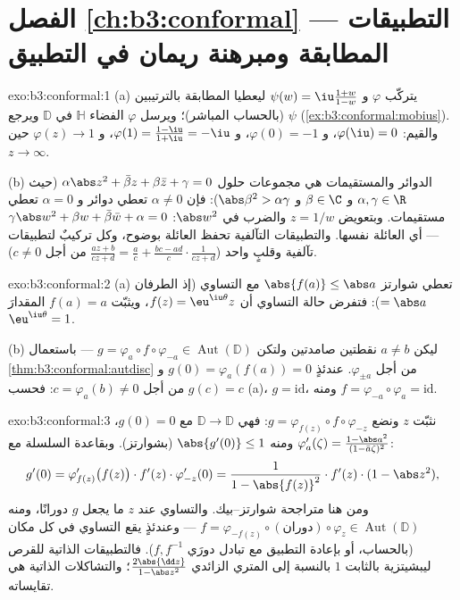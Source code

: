 \section*{الفصل \ref{ch:b3:conformal} --- التطبيقات المطابقة
ومبرهنة ريمان في التطبيق}

\begin{solution}{exo:b3:conformal:1}
(a) يتركّب $\varphi$ و $\psi(w) = \iu\frac{1+w}{1-w}$ ليعطيا المطابقة بالترتيبين (بالحساب
المباشر)؛ ويرسل $\varphi$ الفضاء $\mathbb H$ في $\mathbb D$
ويرجع $\psi$ (\cref{ex:b3:conformal:mobius}). والقيم: $\varphi(\iu) = 0$، و $\varphi(0) = -1$، و $\varphi(1) = \frac{1 - \iu}{1 + \iu} =
-\iu$،
و $\varphi(z) \to 1$ حين $z \to \infty$.

(b) الدوائر والمستقيمات هي مجموعات حلول
$\alpha\abs z^2 + \bar\beta z + \beta\bar z + \gamma = 0$
(حيث $\alpha, \gamma \in \R$ و $\beta \in \C$ و $\abs\beta^2 >
\alpha\gamma$): فإن $\alpha \neq 0$
تعطي دوائر و $\alpha = 0$ تعطي مستقيمات. وبتعويض $z = 1/w$
والضرب في $\abs w^2$: $\gamma\abs w^2 + \beta w + \bar\beta\bar w + \alpha = 0$ --- أي العائلة نفسها. والتطبيقات
التآلفية تحفظ العائلة بوضوح، وكل  تركيبٌ لتطبيقات
تآلفية وقلبٍ واحد ($\frac{az+b}{cz+d} = \frac ac + \frac{bc -
ad}{c}\cdot\frac1{cz + d}$ من أجل $c \neq 0$).
\end{solution}

\begin{solution}{exo:b3:conformal:2}
(a) تعطي شوارتز $\abs{f(a)} \leq \abs a$ مع التساوي (إذ الطرفان $= \abs a$):
فتفرض حالة التساوي أن $f(z) =
\eu^{\iu\theta}z$، ويثبّت $f(a) = a$ المقدارَ $\eu^{\iu\theta} = 1$.

(b) ليكن $a \neq b$ نقطتين صامدتين ولتكن $g =
\varphi_a\circ f\circ\varphi_{-a} \in
\operatorname{Aut}(\mathbb D)$ --- باستعمال
\cref{thm:b3:conformal:autdisc} من أجل $\varphi_{\pm a}$. عندئذٍ $g(0) = \varphi_a(f(a)) = 0$ و $g(c) = c$ من أجل
$c =
\varphi_a(b) \neq 0$: فحسب (a)، $g = \mathrm{id}$، ومنه $f =
\varphi_{-a}\circ\varphi_a = \mathrm{id}$.
\end{solution}

\begin{solution}{exo:b3:conformal:3}
نثبّت $z$ ونضع $g = \varphi_{f(z)}\circ f\circ\varphi_{-z}$: فهي  $\mathbb D \to \mathbb D$ مع $g(0) = 0$،
ومنه $\abs{g'(0)} \leq 1$ (بشوارتز). وبقاعدة السلسلة مع $\varphi_a'(\zeta) = \frac{1 - \abs a^2}{(1 - \bar
a\zeta)^2}$:
\[
g'(0) = \varphi_{f(z)}'\bigl(f(z)\bigr)\cdot f'(z)\cdot
\varphi_{-z}'(0)
= \frac{1}{1 - \abs{f(z)}^2}\cdot f'(z)\cdot(1 - \abs z^2),
\]
ومن هنا متراجحة شوارتز--بيك. والتساوي عند $z$ ما يجعل $g$
دورانًا، ومنه $f =
\varphi_{-f(z)}\circ(\text{دوران})\circ\varphi_z \in
\operatorname{Aut}(\mathbb D)$ --- وعندئذٍ يقع التساوي في كل مكان
(بالحساب، أو بإعادة التطبيق مع تبادل دورَي $f, f^{-1}$).
فالتطبيقات الذاتية  للقرص ليبشيتزية بالثابت $1$
بالنسبة إلى المتري الزائدي $\frac{2\abs{\dd
z}}{1 - \abs z^2}$؛ والتشاكلات الذاتية هي
تقايساته.
\end{solution}

